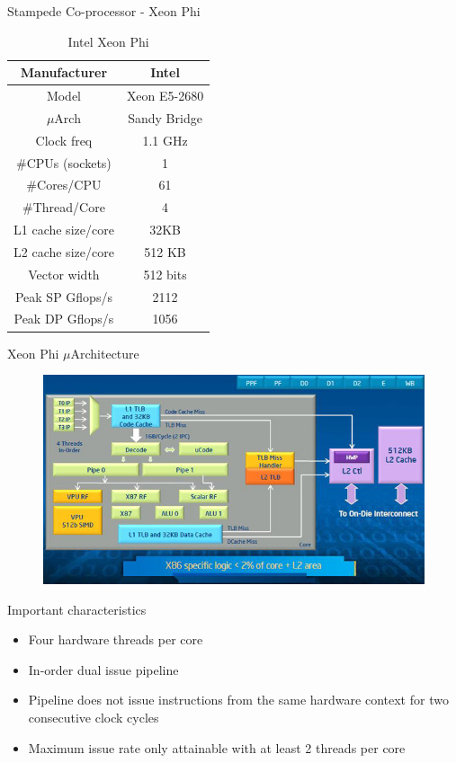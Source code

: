 \documentclass{beamer}
\begin{document}

\begin{frame}{Stampede Co-processor - Xeon Phi}
\begin{table}[H]
\centering
\footnotesize
\begin{tabular}{| c | c |}\hline
Manufacturer & Intel\\ \hline
Model & Xeon E5-2680\\ \hline
$\mu$Arch & Sandy Bridge\\ \hline
Clock freq & 1.1 GHz\\ \hline
\#CPUs (sockets) & 1 \\ \hline
\#Cores/CPU & 61\\ \hline
\#Thread/Core & 4\\ \hline
L1 cache size/core & 32KB\\ \hline
L2 cache size/core & 512 KB\\ \hline
Vector width & 512 bits\\ \hline
Peak SP Gflops/s & 2112\\ \hline
Peak DP Gflops/s & 1056\\ \hline
\end{tabular}
\caption{Intel Xeon Phi}
\end{table}
\end{frame}

\begin{frame}{Xeon Phi $\mu$Architecture}
  \begin{center}
  \begin{figure}[htbp]
      \includegraphics[scale=.45]{img/phi_arch.jpg}
  \end{figure}
  \end{center}
\end{frame}

\begin{frame}{Important characteristics}
  \begin{itemize}
    \item Four hardware threads per core
    \item In-order dual issue pipeline
    \item Pipeline does not issue instructions from the same hardware
      context for two consecutive clock cycles
    \item Maximum issue rate only attainable with at least 2 threads per
      core
  \end{itemize}
\end{frame}
\end{document}
